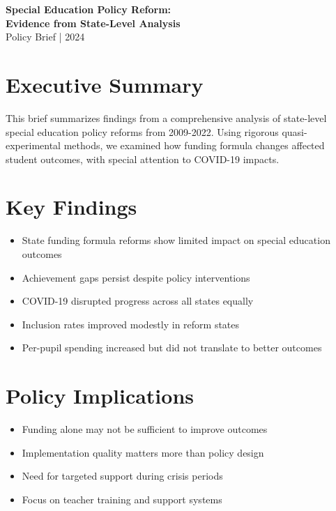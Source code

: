 \documentclass[11pt,letterpaper]{article}
\begin{document}
\noindent
{\LARGE \textbf{\color{headerblue}Special Education Policy Reform:}}\\
{\Large \textbf{Evidence from State-Level Analysis}}\\[0.5em]
{\large Policy Brief | 2024}

\section*{Executive Summary}
This brief summarizes findings from a comprehensive analysis of state-level special education 
policy reforms from 2009-2022. Using rigorous quasi-experimental methods, we examined how 
funding formula changes affected student outcomes, with special attention to COVID-19 impacts.

\section*{Key Findings}
\begin{itemize}[leftmargin=*,itemsep=0.5em]
\item State funding formula reforms show limited impact on special education outcomes
\item Achievement gaps persist despite policy interventions
\item COVID-19 disrupted progress across all states equally
\item Inclusion rates improved modestly in reform states
\item Per-pupil spending increased but did not translate to better outcomes

\end{itemize}

\section*{Policy Implications}
\begin{itemize}[leftmargin=*,itemsep=0.5em]
\item Funding alone may not be sufficient to improve outcomes
\item Implementation quality matters more than policy design
\item Need for targeted support during crisis periods
\item Focus on teacher training and support systems

\end{itemize}
\end{document}
